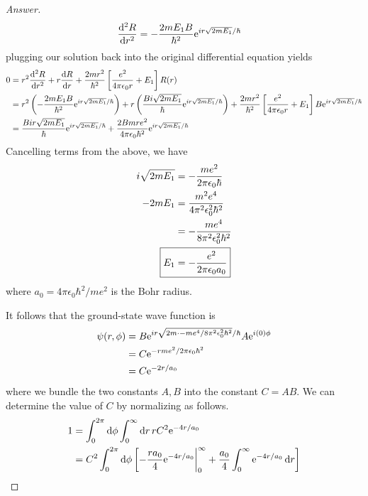 \documentclass[../psets.tex]{subfiles}
\begin{document}
\begin{enumerate}
\begin{enumerate}
\begin{proof}[Answer]
\begin{align*}
                \dv[2]{R}{r} &= -\frac{2mE_1B}{\hbar^2}\e[ir\sqrt{2mE_1}/\hbar]
            \end{align*}
            plugging our solution back into the original differential equation yields
            \begin{align*}
                0 &= r^2\dv[2]{R}{r}+r\dv{R}{r}+\frac{2mr^2}{\hbar^2}\left[ \frac{e^2}{4\pi\epsilon_0r}+E_1 \right]R(r)\\
                &= r^2\left( -\frac{2mE_1B}{\hbar^2}\e[ir\sqrt{2mE_1}/\hbar] \right)+r\left( \frac{Bi\sqrt{2mE_1}}{\hbar}\e[ir\sqrt{2mE_1}/\hbar] \right)+\frac{2mr^2}{\hbar^2}\left[ \frac{e^2}{4\pi\epsilon_0r}+E_1 \right]B\e[ir\sqrt{2mE_1}/\hbar]\\
                &= \frac{Bir\sqrt{2mE_1}}{\hbar}\e[ir\sqrt{2mE_1}/\hbar]+\frac{2Bmre^2}{4\pi\epsilon_0\hbar^2}\e[ir\sqrt{2mE_1}/\hbar]
            \end{align*}
            Cancelling terms from the above, we have
            \begin{align*}
                i\sqrt{2mE_1} &= -\frac{me^2}{2\pi\epsilon_0\hbar}\\
                -2mE_1 &= \frac{m^2e^4}{4\pi^2\epsilon_0^2\hbar^2}\\
                &= -\frac{me^4}{8\pi^2\epsilon_0^2\hbar^2}\\
                \Aboxed{E_1 &= -\frac{e^2}{2\pi\epsilon_0a_0}}
            \end{align*}
            where $a_0=4\pi\epsilon_0\hbar^2/me^2$ is the Bohr radius.\par
            It follows that the ground-state wave function is
            \begin{align*}
                \psi(r,\phi) &= B\e[ir\sqrt{2m\cdot -me^4/8\pi^2\epsilon_0^2\hbar^2}/\hbar]A\e[i(0)\phi]\\
                &= C\e[-rme^2/2\pi\epsilon_0\hbar^2]\\
                &= C\e[-2r/a_0]
            \end{align*}
            where we bundle the two constants $A,B$ into the constant $C=AB$. We can determine the value of $C$ by normalizing as follows.
            \begin{align*}
                1 &= \int_0^{2\pi}\dd{\phi}\int_0^\infty\dd{r}rC^2\e[-4r/a_0]\\
                &= C^2\int_0^{2\pi}\dd{\phi}\left[ -\frac{ra_0}{4}\e[-4r/a_0]\bigg|_0^\infty+\frac{a_0}{4}\int_0^\infty\e[-4r/a_0]\dd{r} \right]\\

\end{align*}
\end{proof}
\end{enumerate}
\end{enumerate}
\end{document}
